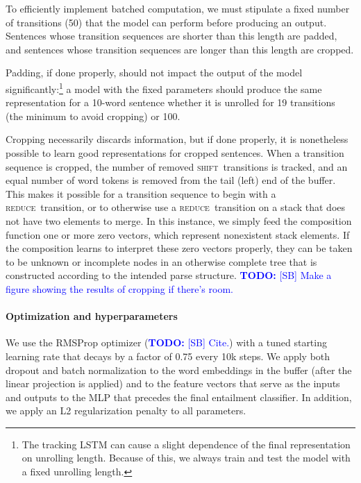 \documentclass[11pt]{article}
\newcommand\todo[1]{\textcolor{blue}{\textbf{TODO:} #1}}
\newcommand{\shift}{\textsc{shift}}
\newcommand{\reduce}{\textsc{reduce}}
\begin{document}
To efficiently implement batched computation, we must stipulate a fixed number of transitions (50) that the model can perform before producing an output. Sentences whose transition sequences are shorter than this length are padded, and sentences whose transition sequences are longer than this length are cropped. 

Padding, if done properly, should not impact the output of the model significantly:\footnote{The tracking LSTM can cause a slight dependence of the final representation on unrolling length. Because of this, we always train and test the model with a fixed unrolling length.} a model with the fixed parameters should produce the same representation for a 10-word sentence whether it is unrolled for 19 transitions (the minimum to avoid cropping) or 100.

Cropping necessarily discards information, but if done properly, it is nonetheless possible to learn good representations for cropped sentences. When a transition sequence is cropped, the number of removed \shift~transitions is tracked, and an equal number of word tokens is removed from the tail (left) end of the buffer. This makes it possible for a transition sequence to begin with a \reduce~transition, or to otherwise use a \reduce~transition on a stack that does not have two elements to merge. In this instance, we simply feed the composition function one or more zero vectors, which represent nonexistent stack elements. If the composition learns to interpret these zero vectors properly, they can be taken to be unknown or incomplete nodes in an otherwise complete tree that is constructed according to the intended parse structure. \todo{[SB] Make a figure showing the results of cropping if there's room.}

\paragraph{Optimization and hyperparameters}

We use the RMSProp optimizer (\todo{[SB] Cite.}) with a tuned starting learning rate that decays by a factor of 0.75 every 10k steps. We apply both dropout \citep{srivastava2014dropout} and batch normalization \citep{2015SIoffeCSzegedy} to the word embeddings in the buffer (after the linear projection is applied) and to the feature vectors that serve as the inputs and outputs to the MLP that precedes the final entailment classifier. In addition, we apply an L2 regularization penalty to all parameters.
\end{document}
